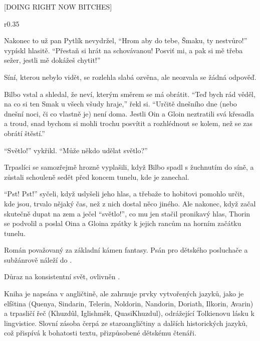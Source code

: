 \documentclass{extarticle} %
\begin{document}
\newpage


\changefontsize{8pt}

[DOING RIGHT NOW BITCHES]

\noindent\begin{wrapfigure}{r}{0.35\textwidth}
\tiny

\setlength{\parindent}{3pt}
Nakonec to už pan Pytlík nevydržel,
\enquote{Hrom aby do tebe, Šmaku, ty nestvůro!} vypískl hlasitě.
\enquote{Přestaň si hrát na schovávanou!
Posviť mi, a pak si mě třeba sežer, jestli mě dokážeš chytit!}\par
Síní, kterou nebylo vidět, se rozlehla slabá ozvěna, ale neozvala se žádná odpověď.\par
Bilbo vstal a shledal, že neví, kterým směrem se má obrátit.
\enquote{Teď bych rád věděl, na co si ten Smak u všech všudy hraje,} řekl si. 
\enquote{Určitě dnešního dne (nebo dnešní noci, či co vlastně je) není doma.
Jestli Oin a Gloin neztratili svá křesadla a troud,
snad bychom si mohli trochu posvítit a rozhlédnout se kolem, než se zas obrátí štěstí.}\par
\enquote{Světlo!} vykřikl. \enquote{Může někdo udělat světlo?}\par
Trpaslíci se samozřejmě hrozně vyplašili, když Bilbo spadl s žuchnutím do síně,
a zůstali schouleně sedět před koncem tunelu, kde je zanechal.\par
\enquote{Pst! Pst!} syčeli, když uslyšeli jeho hlas,
a třebaže to hobitovi pomohlo určit, kde jsou, trvalo nějaký čas,
než z nich dostal něco jiného.
Ale nakonec, když začal skutečně dupat na zem a ječel \enquote{světlo!},
co mu jen stačil pronikavý hlas, Thorin se podvolil
a poslal Oina a Gloina zpátky k jejich rancům na horním začátku tunelu.\par
\end{wrapfigure}


\noindent Román považovaný za základní kámen fantasy.
Psán pro dětského posluchače a subžánrově náleží do .

\noindent Důraz na konsistentní svět, ovlivněn .

\noindent Kniha je napsána v angličtině, ale zahrnuje prvky vytvořených jazyků,
jako je elfština (Quenya, Sindarin, Telerin, Noldorin, Nandorin, Doriath, Ilkorin, Avarin)
a trpasličí řeč (Khuzdûl, Iglishmêk, QuasiKhuzdul), odrážející Tolkienovu lásku k lingvistice.
Slovní zásoba čerpá ze staroangličtiny a dalších historických jazyků, což přispívá k bohatosti textu,
přizpůsobené dětskému čtenáři.
\end{document}
